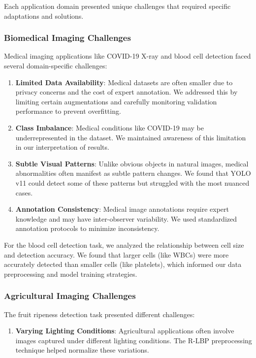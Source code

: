 \begin{multicols}{2}
Each application domain presented unique challenges that required specific adaptations and solutions.

\subsubsection{Biomedical Imaging Challenges}

Medical imaging applications like COVID-19 X-ray and blood cell detection faced several domain-specific challenges:

\begin{enumerate}
    \item \textbf{Limited Data Availability}: Medical datasets are often smaller due to privacy concerns and the cost of expert annotation. We addressed this by limiting certain augmentations and carefully monitoring validation performance to prevent overfitting.
    
    \item \textbf{Class Imbalance}: Medical conditions like COVID-19 may be underrepresented in the dataset. We maintained awareness of this limitation in our interpretation of results.
    
    \item \textbf{Subtle Visual Patterns}: Unlike obvious objects in natural images, medical abnormalities often manifest as subtle pattern changes. We found that YOLO v11 could detect some of these patterns but struggled with the most nuanced cases.
    
    \item \textbf{Annotation Consistency}: Medical image annotations require expert knowledge and may have inter-observer variability. We used standardized annotation protocols to minimize inconsistency.
\end{enumerate}

For the blood cell detection task, we analyzed the relationship between cell size and detection accuracy. We found that larger cells (like WBCs) were more accurately detected than smaller cells (like platelets), which informed our data preprocessing and model training strategies.

\subsubsection{Agricultural Imaging Challenges}

The fruit ripeness detection task presented different challenges:

\begin{enumerate}
    \item \textbf{Varying Lighting Conditions}: Agricultural applications often involve images captured under different lighting conditions. The R-LBP preprocessing technique helped normalize these variations.
    

\end{enumerate}
\end{multicols}
